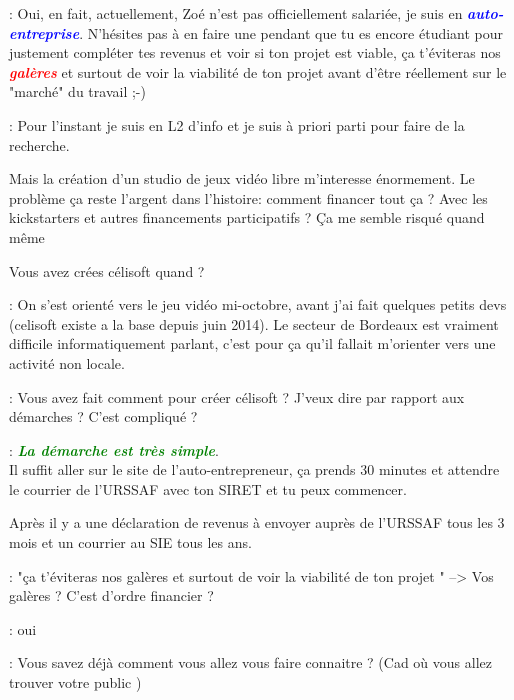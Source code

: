 \documentclass[a4paper,12pt, draft]{report}
\newcommand{\goodPoint}[1]{\textcolor{green}{\textbf{\textit{#1}}}}
\newcommand{\badPoint}[1]{\textcolor{red}{\textbf{\textit{#1}}}}
\newcommand{\importantPoint}[1]{\textcolor{blue}{\textbf{\textit{#1}}}}
\begin{document}
\begin{description}
\item [Réponse]: Oui, en fait, actuellement, Zoé n'est pas officiellement salariée, je suis en \importantPoint{auto-entreprise}. N’hésites pas à en faire une pendant que tu es encore étudiant pour justement compléter tes revenus et voir si ton projet est viable, ça t'éviteras nos \badPoint{galères} et surtout de voir la viabilité de ton projet avant d'être réellement sur le "marché" du travail ;-)
\item 
\item [Question]: Pour l'instant je suis en L2 d'info et je suis à priori parti pour faire de la recherche.
\item Mais la création d'un studio de jeux vidéo libre m'interesse énormement. Le problème ça reste l'argent dans l'histoire: comment financer tout ça ? Avec les kickstarters et autres financements participatifs ? Ça me semble risqué quand même  
\item 
\item Vous avez crées célisoft quand ?
\item 
\item [Réponse]: On s'est orienté vers le jeu vidéo mi-octobre, avant j'ai fait quelques petits devs (celisoft existe a la base depuis juin 2014). Le secteur de Bordeaux est vraiment difficile informatiquement parlant, c'est pour ça qu'il fallait m'orienter vers une activité non locale.
\item 
\item [Question]: Vous avez fait comment pour créer célisoft ? J'veux dire par rapport aux démarches ? C'est compliqué ?
\item 
\item [Réponse]: \goodPoint{La démarche est très simple}. \\Il suffit aller sur le site de l'auto-entrepreneur, ça prends 30 minutes et attendre le courrier de l'URSSAF avec ton SIRET et tu peux commencer.
\item Après il y a une déclaration de revenus à envoyer auprès de l'URSSAF tous les 3 mois et un courrier au SIE tous les ans.
\item 
\item [Question]: "ça t'éviteras nos galères et surtout de voir la viabilité de ton projet " --> Vos galères ? C'est d'ordre financier ?
\item 
\item [Réponse]: oui  
\item 
\item [Question]: Vous savez déjà comment vous allez vous faire connaitre ? (Cad où vous allez trouver votre public )

\end{description}
\end{document}

